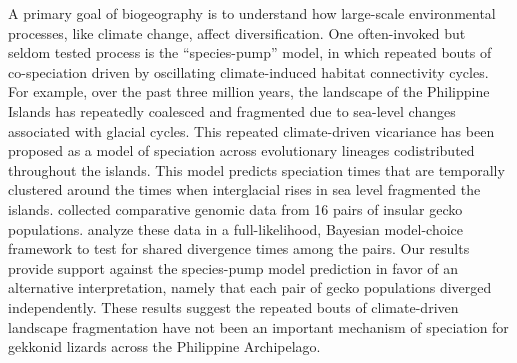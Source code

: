 A primary goal of biogeography is to understand how large-scale environmental
processes, like climate change, affect diversification.
One often-invoked but seldom tested process is the  ``species-pump''
model, in which repeated bouts of co-speciation  driven by oscillating
climate-induced habitat connectivity cycles.
For example, over the past three million years, the landscape of the Philippine
Islands has repeatedly coalesced and fragmented due to sea-level changes
associated with  glacial cycles.
This repeated climate-driven vicariance has been proposed as a model of
speciation across evolutionary lineages codistributed throughout the islands.
This model predicts speciation times that are temporally clustered around
the times when interglacial rises in sea level fragmented the islands.
 collected comparative genomic data from 16 pairs of insular gecko populations.
 analyze these data in a full-likelihood, Bayesian model-choice
framework to test for shared divergence times among the pairs.
Our results provide support against the species-pump model prediction in favor
of an alternative interpretation, namely that each pair of gecko populations
diverged independently.
These results suggest the repeated bouts of climate-driven landscape
fragmentation have not been an important mechanism of speciation for
gekkonid lizards across the Philippine Archipelago.
